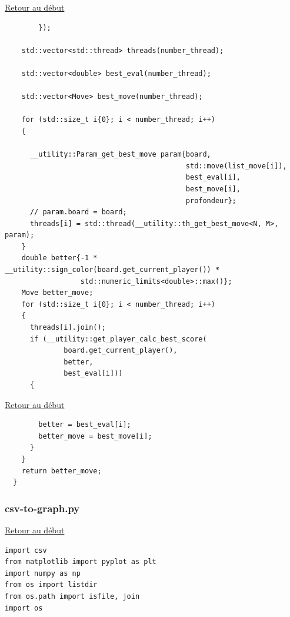 {\begin{frame}[fragile]
\hyperlink{conclusion}{Retour au début}\newline
\begin{verbatim}
        });

    std::vector<std::thread> threads(number_thread);

    std::vector<double> best_eval(number_thread);

    std::vector<Move> best_move(number_thread);

    for (std::size_t i{0}; i < number_thread; i++)
    {

      __utility::Param_get_best_move param{board,
                                           std::move(list_move[i]),
                                           best_eval[i],
                                           best_move[i],
                                           profondeur};
      // param.board = board;
      threads[i] = std::thread(__utility::th_get_best_move<N, M>, param);
    }
    double better{-1 * __utility::sign_color(board.get_current_player()) *
                  std::numeric_limits<double>::max()};
    Move better_move;
    for (std::size_t i{0}; i < number_thread; i++)
    {
      threads[i].join();
      if (__utility::get_player_calc_best_score(
              board.get_current_player(),
              better,
              best_eval[i]))
      {
\end{verbatim}
\end{frame}

\begin{frame}[fragile]
\hyperlink{conclusion}{Retour au début}\newline
\begin{verbatim}
        better = best_eval[i];
        better_move = best_move[i];
      }
    }
    return better_move;
  }

\end{verbatim}
\end{frame}

\begin{frame}[fragile]
\label{csv-to-graph.py}
\frametitle{csv-to-graph.py}
\hyperlink{conclusion}{Retour au début}\newline
\begin{verbatim}
import csv
from matplotlib import pyplot as plt
import numpy as np
from os import listdir
from os.path import isfile, join
import os



\end{verbatim}
\end{frame}}
